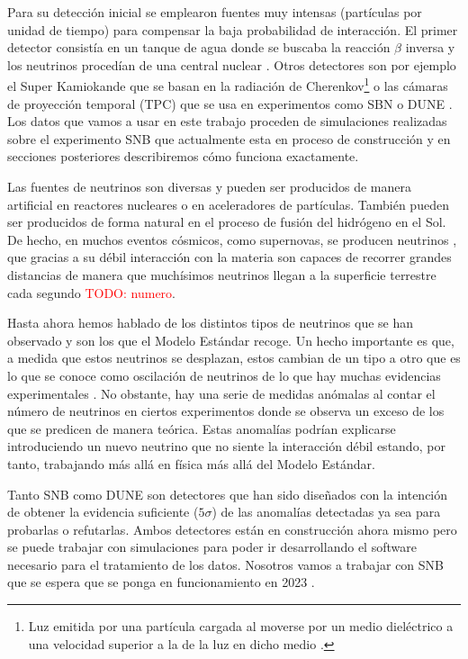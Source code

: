 \documentclass[a4paper,12pt,twoside,titlepage]{article}
\newcommand{\red}[1]{\textcolor{red}{#1}}
\begin{document}
Para su detección inicial se emplearon fuentes muy intensas (partículas por unidad de tiempo) para compensar la baja probabilidad de interacción. El primer detector consistía en un tanque de agua donde se buscaba la reacción $\beta$ inversa y los neutrinos procedían de una central nuclear \cite{particle_griff}. Otros detectores son por ejemplo el Super Kamiokande \cite{kamiokande} que se basan en la radiación de Cherenkov\footnote{Luz emitida por una partícula cargada al moverse por un medio dieléctrico a una velocidad superior a la de la luz en dicho medio \cite{jackson}.} o las cámaras de proyección temporal (TPC) que se usa en experimentos como SBN \cite{sbnd} o DUNE \cite{dune}. Los datos que vamos a usar en este trabajo proceden de simulaciones realizadas sobre el experimento SNB que actualmente esta en proceso de construcción y en secciones posteriores describiremos cómo funciona exactamente.

Las fuentes de neutrinos son diversas y pueden ser producidos de manera artificial en reactores nucleares o en aceleradores de partículas. También pueden ser producidos de forma natural en el proceso de fusión del hidrógeno en el Sol. De hecho, en muchos eventos cósmicos, como supernovas, se producen neutrinos \cite{supernova}, que gracias a su débil interacción con la materia son capaces de recorrer grandes distancias de manera que muchísimos neutrinos llegan a la superficie terrestre cada segundo \red{TODO: numero}.

Hasta ahora hemos hablado de los distintos tipos de neutrinos que se han observado y son los que el Modelo Estándar recoge. Un hecho importante es que, a medida que estos neutrinos se desplazan, estos cambian de un tipo a otro que es lo que se conoce como oscilación de neutrinos de lo que hay muchas evidencias experimentales \cite{oscilation}. No obstante, hay una serie de medidas anómalas al contar el número de neutrinos en ciertos experimentos donde se observa un exceso de los que se predicen de manera teórica. Estas anomalías podrían explicarse introduciendo un nuevo neutrino que no siente la interacción débil \cite{sbnd} estando, por tanto, trabajando más allá en física más allá del Modelo Estándar.

Tanto SNB como DUNE son detectores que han sido diseñados con la intención de obtener la evidencia suficiente ($5\sigma$) de las anomalías detectadas ya sea para probarlas o refutarlas. Ambos detectores están en construcción ahora mismo pero se puede trabajar con simulaciones para poder ir desarrollando el software necesario para el tratamiento de los datos. Nosotros vamos a trabajar con SNB que se espera que se ponga en funcionamiento en 2023 \cite{sbnd_page}.
\end{document}
